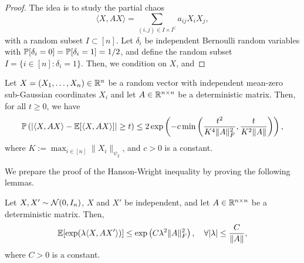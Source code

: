 \begin{proof}
	The idea is to study the partial chaos
	\begin{equation*}
		\langle X, AX\rangle=\sum_{(i,j)\in I\times I^{\complement}}a_{ij}X_{i}X_{j},
	\end{equation*}
	with a random subset \(I\subset[n]\). Let \(\delta_{i}\) be independent Bernoulli random variables with \({\mathbb P}[\delta_{i}=0]={\mathbb P}[\delta_{i}=1]=1/2\), and define the random subset \(I=\{i\in[n]:\delta_{i}=1\}\). Then, we condition on \(X\), and 
\end{proof}

\begin{theorem}
	Let \(X=(X_{1},\ldots, X_{n})\in{\mathbb R}^{n}\) be a random vector with independent mean-zero sub-Gaussian coordinates \(X_{i}\) and let \(A\in{\mathbb R}^{n\times n}\) be a deterministic matrix. Then, for all \(t\geq0\), we have
	\begin{equation*}
		{\mathbb P}\left(\left|\langle X, AX\rangle-{\mathbb E}[\langle X, AX\rangle]\right|\geq t\right)\leq 2\exp\left(-c\min\left(\frac{t^2}{K^{4}\|A\|_{F}^{2}}, \frac{t}{K^{2}\|A\|}\right)\right),
	\end{equation*}
	where \(K:=\max_{i\in[n]}\|X_{i}\|_{\psi_{2}}\), and \(c>0\) is a constant.
\end{theorem}

We prepare the proof of the Hanson-Wright inequality by proving the following lemmas.

\begin{lemma}
	Let \(X,X'\sim{\mathcal N}(0, I_{n})\), \(X\) and \(X'\) be independent, and let \(A\in{\mathbb R}^{n\times n}\) be a deterministic matrix. Then,
	\begin{equation*}
		{\mathbb E}[\exp(\lambda\langle X, AX'\rangle)]\leq\exp\left(C\lambda^{2}\|A\|_{F}^{2}\right),\quad\forall|\lambda|\leq\frac{C}{\|A\|},
	\end{equation*}
	where \(C>0\) is a constant.
\end{lemma}

